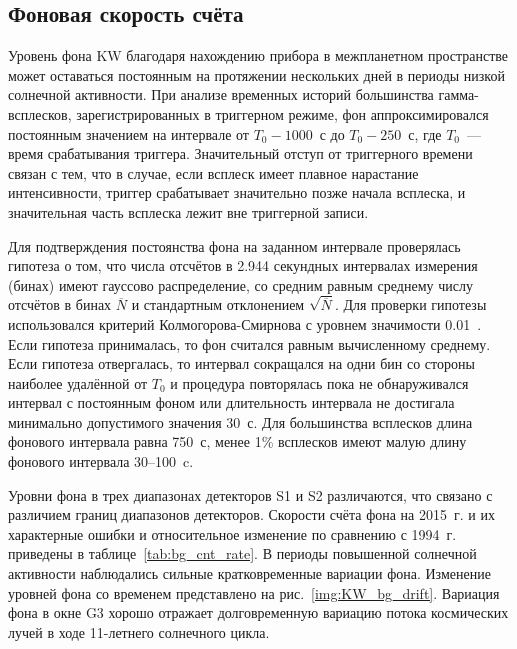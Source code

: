 \subsection{Фоновая скорость счёта}\label{sec:Bg_rate}
Уровень фона KW благодаря нахождению прибора в межпланетном пространстве 
может оставаться постоянным на протяжении нескольких дней в периоды низкой 
солнечной активности. При анализе временных историй большинства гамма-всплесков, 
зарегистрированных в триггерном режиме, фон аппроксимировался 
постоянным значением на интервале от $T_0 - 1000$~с до $T_0 - 250$~с, 
где $T_0$~--- время срабатывания триггера. Значительный отступ от триггерного 
времени связан с тем, что 
в случае, если всплеск имеет плавное нарастание интенсивности, 
триггер срабатывает значительно позже начала всплеска, и
значительная часть всплеска лежит вне триггерной записи. 

Для подтверждения постоянства фона на заданном интервале проверялась гипотеза о том, 
что числа отсчётов в 2.944 секундных интервалах измерения (бинах) 
имеют гауссово распределение, со средним равным среднему числу отсчётов 
в бинах $\overline{N}$ и стандартным отклонением $\sqrt{\overline{N}}$. 
Для проверки гипотезы использовался критерий Колмогорова-Смирнова с уровнем значимости 0.01~\citep{Press_1992NumRec}. 
Если гипотеза принималась, то фон считался равным вычисленному среднему. 
Если гипотеза отвергалась, то интервал сокращался на одни бин со стороны наиболее 
удалённой от $T_0$ и процедура повторялась пока не обнаруживался интервал с постоянным фоном 
или длительность интервала не достигала минимально допустимого значения 30~с. 
Для большинства всплесков длина фонового интервала равна 750~с, менее 1\% 
всплесков имеют малую длину фонового интервала 30--100~c.

Уровни фона в трех диапазонах детекторов S1 и S2 различаются, 
что связано с различием границ диапазонов детекторов. Скорости счёта фона 
на 2015~г. и их характерные ошибки и относительное изменение по сравнению с 1994~г.
приведены в таблице~\ref{tab:bg_cnt_rate}.
В периоды повышенной солнечной активности наблюдались сильные кратковременные вариации фона. 
Изменение уровней фона со временем представлено на рис.~\ref{img:KW_bg_drift}.
Вариация фона в окне G3 хорошо отражает долговременную вариацию потока космических 
лучей в ходе 11-летнего солнечного цикла. 

 

